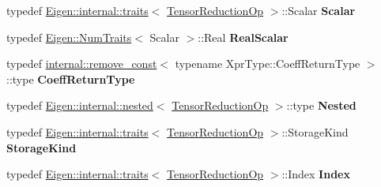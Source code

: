 \begin{DoxyCompactItemize}
\item 
\mbox{\label{class_eigen_1_1_tensor_reduction_op_a270a050b616d21c50f3e3579c80f29c6}} 
typedef \hyperlink{struct_eigen_1_1internal_1_1traits}{Eigen\+::internal\+::traits}$<$ \hyperlink{class_eigen_1_1_tensor_reduction_op}{Tensor\+Reduction\+Op} $>$\+::Scalar {\bfseries Scalar}
\item 
\mbox{\label{class_eigen_1_1_tensor_reduction_op_ab8c0e1c64b0c349b5df071d3efc2e801}} 
typedef \hyperlink{group___core___module_struct_eigen_1_1_num_traits}{Eigen\+::\+Num\+Traits}$<$ Scalar $>$\+::Real {\bfseries Real\+Scalar}
\item 
\mbox{\label{class_eigen_1_1_tensor_reduction_op_a3c887ebb74b9232e849c3d49d994dcf3}} 
typedef \hyperlink{struct_eigen_1_1internal_1_1remove__const}{internal\+::remove\+\_\+const}$<$ typename Xpr\+Type\+::\+Coeff\+Return\+Type $>$\+::type {\bfseries Coeff\+Return\+Type}
\item 
\mbox{\label{class_eigen_1_1_tensor_reduction_op_a3a1c56fb5f45577d7ad7820553db1054}} 
typedef \hyperlink{struct_eigen_1_1internal_1_1nested}{Eigen\+::internal\+::nested}$<$ \hyperlink{class_eigen_1_1_tensor_reduction_op}{Tensor\+Reduction\+Op} $>$\+::type {\bfseries Nested}
\item 
\mbox{\label{class_eigen_1_1_tensor_reduction_op_a3a5b36e80467952c79c19e1979ed0952}} 
typedef \hyperlink{struct_eigen_1_1internal_1_1traits}{Eigen\+::internal\+::traits}$<$ \hyperlink{class_eigen_1_1_tensor_reduction_op}{Tensor\+Reduction\+Op} $>$\+::Storage\+Kind {\bfseries Storage\+Kind}
\item 
\mbox{\label{class_eigen_1_1_tensor_reduction_op_a6a5cf586d26b3a89a4d660ab51fb61a9}} 
typedef \hyperlink{struct_eigen_1_1internal_1_1traits}{Eigen\+::internal\+::traits}$<$ \hyperlink{class_eigen_1_1_tensor_reduction_op}{Tensor\+Reduction\+Op} $>$\+::Index {\bfseries Index}
\end{DoxyCompactItemize}

